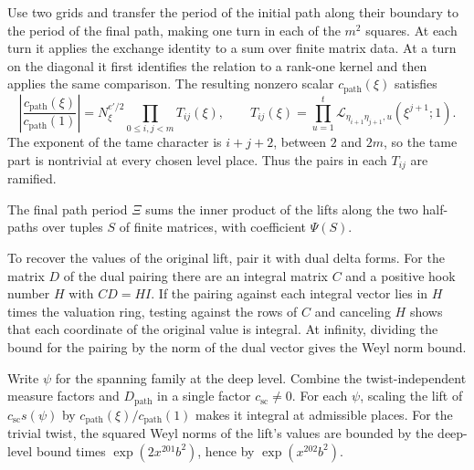 Use two grids and transfer the period of the initial path along their boundary
to the period of the final path, making one turn in each of the \(m^2\)
squares. At each turn it applies the exchange identity to a sum over
finite matrix data. At a turn on the diagonal it first identifies the
relation to a rank-one kernel and then applies the same comparison.
The resulting nonzero scalar \(c_{\mathrm{path}}(\xi)\) satisfies
\begin{equation}
 \left|\frac{c_{\mathrm{path}}(\xi)}{c_{\mathrm{path}}(1)}\right|
   =N_\xi^{e'/2}\prod_{0\le i,j<m} T_{ij}(\xi),\qquad
 T_{ij}(\xi)=
    \prod_{u=1}^{t}\mathcal L_{\eta_{i+1}\eta_{j+1},u}(\xi^{j+1};1).
 \label{eq:turn-ratio-lower}
\end{equation}
The exponent of the tame character is \(i+j+2\), between \(2\) and \(2m\),
so the tame part is nontrivial at every chosen level place. Thus the
pairs in each \(T_{ij}\) are ramified.

The final path period \(\Xi\) sums the inner product of the lifts along the two
half-paths over tuples \(S\) of finite matrices, with coefficient \(\Psi(S)\).


To recover the values of the original lift, pair it with dual
delta forms. For the matrix \(D\) of the dual pairing there are an integral
matrix \(C\) and a positive hook number \(H\) with \(CD=HI\).
If the pairing against each integral vector lies in \(H\) times the
valuation ring, testing against the rows of \(C\) and canceling \(H\) shows
that each coordinate of the original value is integral. At infinity, dividing
the bound for the pairing by the norm of the dual vector gives the Weyl
norm bound.

Write \(\psi\) for the spanning family at the deep level. Combine the
twist-independent measure factors and \(D_\mathrm{path}\) in a single
factor \(c_{\mathrm{sc}}\ne0\).
For each \(\psi\), scaling the lift of \(c_{\mathrm{sc}}s(\psi)\) by
\(c_{\mathrm{path}}(\xi)/c_{\mathrm{path}}(1)\) makes it integral at
admissible places. For the trivial twist, the squared Weyl norms of the
lift's values are bounded by the deep-level bound times
\(\exp(2x^{201}b^2)\), hence by \(\exp(x^{202}b^2)\).

